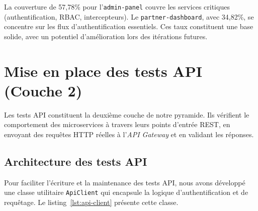 La couverture de 57,78\% pour l'\texttt{admin-panel} couvre les services critiques
(authentification, RBAC, intercepteurs). Le \texttt{partner-dashboard}, avec 34,82\%,
se concentre sur les flux d'authentification essentiels. Ces taux constituent une base
solide, avec un potentiel d'amélioration lors des itérations futures.

\section{Mise en place des tests API (Couche 2)}
\label{sec:tests-api}

Les tests API constituent la deuxième couche de notre pyramide. Ils vérifient le
comportement des microservices à travers leurs points d'entrée REST, en envoyant des
requêtes HTTP réelles à l'\textit{API Gateway} et en validant les réponses.

\subsection{Architecture des tests API}
\label{subsec:archi-tests-api}

Pour faciliter l'écriture et la maintenance des tests API, nous avons développé une
classe utilitaire \texttt{ApiClient} qui encapsule la logique d'authentification et de
requêtage. Le listing~\ref{lst:api-client} présente cette classe.

